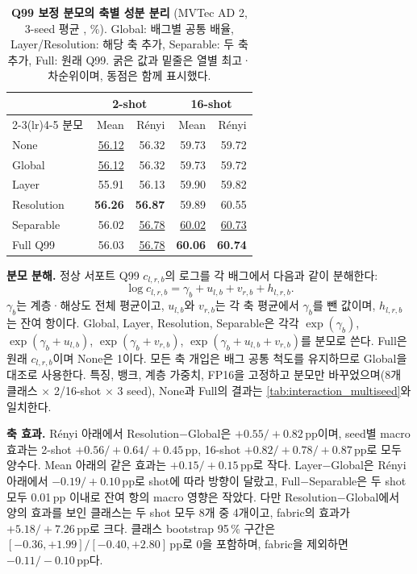 \begin{table}[!htbp]
\centering\scriptsize\setlength{\tabcolsep}{3pt}
\caption{\textbf{Q99 보정 분모의 축별 성분 분리} (MVTec AD 2, 3-seed 평균 \AUPRO, \%). Global: 배그별 공통 배율, Layer/Resolution: 해당 축 추가, Separable: 두 축 추가, Full: 원래 Q99. 굵은 값과 밑줄은 열별 최고·차순위이며, 동점은 함께 표시했다.}
\label{tab:calibration_axis}
\begin{tabular*}{\columnwidth}{@{\extracolsep{\fill}}lrrrr}
\toprule
& \multicolumn{2}{c}{2-shot} & \multicolumn{2}{c}{16-shot} \\
\cmidrule(lr){2-3}\cmidrule(lr){4-5}
분모 & Mean & Rényi & Mean & Rényi \\
\midrule
None & \underline{56.12} & 56.32 & 59.73 & 59.72 \\
Global & \underline{56.12} & 56.32 & 59.73 & 59.72 \\
Layer & 55.91 & 56.13 & 59.90 & 59.82 \\
Resolution & \textbf{56.26} & \textbf{56.87} & 59.89 & 60.55 \\
Separable & 56.02 & \underline{56.78} & \underline{60.02} & \underline{60.73} \\
Full Q99 & 56.03 & \underline{56.78} & \textbf{60.06} & \textbf{60.74} \\
\bottomrule
\end{tabular*}
\end{table}

\noindent\textbf{분모 분해.}
정상 서포트 Q99 $c_{l,r,b}$의 로그를 각 배그에서 다음과 같이 분해한다:
\begin{equation}
  \log c_{l,r,b}=\gamma_b+u_{l,b}+v_{r,b}+h_{l,r,b}.
  \label{eq:calibration-axis-factor}
\end{equation}
$\gamma_b$는 계층·해상도 전체 평균이고, $u_{l,b}$와 $v_{r,b}$는 각 축 평균에서 $\gamma_b$를 뺀 값이며, $h_{l,r,b}$는 잔여 항이다.
Global, Layer, Resolution, Separable은 각각 $\exp(\gamma_b)$, $\exp(\gamma_b+u_{l,b})$, $\exp(\gamma_b+v_{r,b})$, $\exp(\gamma_b+u_{l,b}+v_{r,b})$를 분모로 쓴다. Full은 원래 $c_{l,r,b}$이며 None은 1이다.
모든 축 개입은 배그 공통 척도를 유지하므로 Global을 대조로 사용한다.
특징, 뱅크, 계층 가중치, FP16을 고정하고 분모만 바꾸었으며(8개 클래스 $\times$ 2/16-shot $\times$ 3 seed), None과 Full의 결과는 \cref{tab:interaction_multiseed}와 일치한다.

\noindent\textbf{축 효과.}
Rényi 아래에서 Resolution$-$Global은 $+0.55/+0.82$\,pp이며, seed별 macro 효과는 2-shot $+0.56/+0.64/+0.45$\,pp, 16-shot $+0.82/+0.78/+0.87$\,pp로 모두 양수다.
Mean 아래의 같은 효과는 $+0.15/+0.15$\,pp로 작다.
Layer$-$Global은 Rényi 아래에서 $-0.19/+0.10$\,pp로 shot에 따라 방향이 달랐고, Full$-$Separable은 두 shot 모두 0.01\,pp 이내로 잔여 항의 macro 영향은 작았다.
다만 Resolution$-$Global에서 양의 효과를 보인 클래스는 두 shot 모두 8개 중 4개이고, fabric의 효과가 $+5.18/+7.26$\,pp로 크다.
클래스 bootstrap 95\,\% 구간은 $[-0.36,+1.99]/[-0.40,+2.80]$\,pp로 0을 포함하며, fabric을 제외하면 $-0.11/-0.10$\,pp다.

